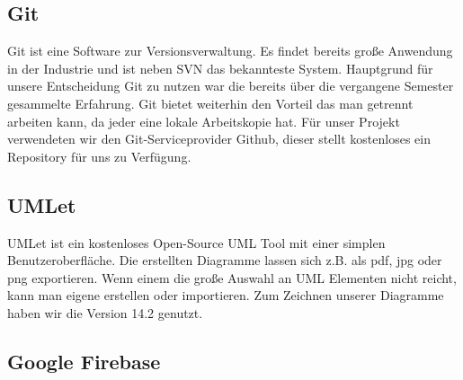 \subsection{Git}

Git ist eine Software zur Versionsverwaltung. Es findet bereits große Anwendung in der Industrie und ist neben SVN das bekannteste System. Hauptgrund für unsere Entscheidung Git zu nutzen war die bereits über die vergangene Semester gesammelte Erfahrung. Git bietet weiterhin den Vorteil das man getrennt arbeiten kann, da jeder eine lokale Arbeitskopie hat. Für unser Projekt verwendeten wir den Git-Serviceprovider Github, dieser stellt kostenloses ein Repository für uns zu Verfügung.

\subsection{UMLet}

UMLet ist ein kostenloses Open-Source UML Tool mit einer simplen Benutzeroberfläche. Die erstellten Diagramme lassen sich z.B. als pdf, jpg oder png exportieren. Wenn einem die große Auswahl an UML Elementen nicht reicht, kann man eigene erstellen oder importieren. Zum Zeichnen unserer Diagramme haben wir die Version 14.2 genutzt. %

\subsection{Google Firebase}

\newpage
